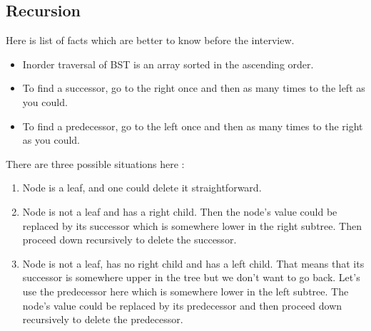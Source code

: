 \subsection{Recursion}
Here is list of facts which are better to know before the interview.
\begin{itemize}
\item Inorder traversal of BST is an array sorted in the ascending order.
\item To find a successor, go to the right once and then as many times to the left as you could.
\item  To find a predecessor, go to the left once and then as many times to the right as you could.
\end{itemize}

There are three possible situations here :

\begin{enumerate}
\item Node is a leaf, and one could delete it straightforward.
\item Node is not a leaf and has a right child. Then the node's value could be replaced by its successor which is somewhere lower in the right subtree. Then proceed down recursively to delete the successor.
\item Node is not a leaf, has no right child and has a left child. That means that its successor is somewhere upper in the tree but we don't want to go back. Let's use the predecessor here which is somewhere lower in the left subtree. The node's value could be replaced by its predecessor and then proceed down recursively to delete the predecessor.
\end{enumerate}

